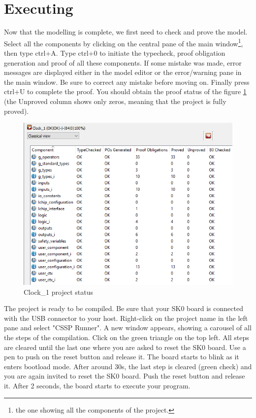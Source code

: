 \section{Executing}

Now that the modelling is complete, we first need to check and prove the model. Select all the components by clicking on the central pane of the main window\footnote{the one showing all the components of the project.}, then type ctrl+A. Type ctrl+0 to initiate the typecheck, proof obligation generation and proof of all these components. If some mistake was made, error messages are displayed either in the model editor or the error/warning pane in the main window. Be sure to correct any mistake before moving on. Finally press ctrl+U to complete the proof. You should obtain the proof status of the figure \ref{projects:Clock_1-project-status} (the Unproved column shows only zeros, meaning that the project is fully proved).

\begin{figure}[h]
\centering\includegraphics[scale=0.5]{Pictures/chaptProjects/clock1-project-status.png}
\caption{Clock\_1 project status}
\label{projects:Clock_1-project-status}
\end{figure}

The project is ready to be compiled. Be sure that your SK0 board is connected with the USB connector to your host. Right-click on the project name in the left pane and select "CSSP Runner". 
A new window appears, showing a carousel of all the steps of the compilation. Click on the green triangle on the top left. All steps are cleared until the last one where you are asked to reset the SK0 board. Use a pen to push on the reset button and release it. The board starts to blink as it enters bootload mode. After around 30s, the last step is cleared (green check) and you are again invited to reset the SK0 board. Push the reset button and release it. After 2 seconds, the board starts to execute your program.

